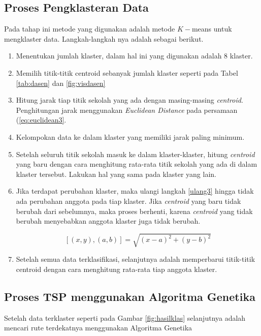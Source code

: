 \subsection{Proses Pengklasteran Data}

Pada tahap ini metode yang digunakan adalah metode $K-$means untuk mengklaster data. Langkah-langkah nya adalah sebagai berikut.

\begin{enumerate}
	\item Menentukan jumlah klaster, dalam hal ini yang digunakan adalah 8 klaster.
	\item Memilih titik-titik centroid sebanyak jumlah klaster seperti pada Tabel \ref{tab:dasen} dan \ref{fig:visdasen}
	\item \label{ulang3} Hitung jarak tiap titik sekolah yang ada dengan masing-masing \textit{centroid}. Penghitungan jarak menggunakan \textit{Euclidean Distance} pada persamaan (\ref{eq:euclidean3}.
	\item Kelompokan data ke dalam klaster yang memiliki jarak paling minimum.
	\item Setelah seluruh titik sekolah masuk ke dalam klaster-klaster, hitung \textit{centroid} yang baru dengan cara menghitung rata-rata titik sekolah yang ada di dalam klaster tersebut. Lakukan hal yang sama pada klaster yang lain.
	\item Jika terdapat perubahan klaster, maka ulangi langkah \ref{ulang3} hingga tidak ada perubahan anggota pada tiap klaster. Jika \textit{centroid} yang baru tidak berubah dari sebelumnya, maka proses berhenti, karena \textit{centroid} yang tidak berubah menyebabkan anggota klaster juga tidak berubah.
	
	\begin{equation}
	\left[ \left( x,y \right) ,\left( a,b \right)\right]=\sqrt{\left( x-a \right)^{2}+\left( y-b \right)^{2}}
	\label{eq:euclidean3}
	\end{equation}
	
	\item Setelah semua data terklasifikasi, selanjutnya adalah memperbarui titik-titik centroid dengan cara menghitung rata-rata tiap anggota klaster.
\end{enumerate}

\subsection{Proses TSP menggunakan Algoritma Genetika}

Setelah data terklaster seperti pada Gambar \ref{fig:hasilklas} selanjutnya adalah mencari rute terdekatnya menggunakan Algoritma Genetika

